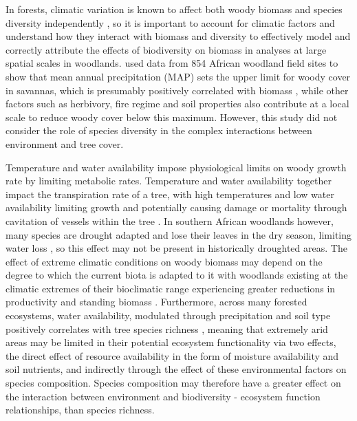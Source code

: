\documentclass[11pt,a4paper]{article}
\begin{document}

In forests, climatic variation is known to affect both woody biomass \citep{Michaletz2014, Michaletz2018} and species diversity independently \citep{}, so it is important to account for climatic factors and understand how they interact with biomass and diversity to effectively model and correctly attribute the effects of biodiversity on biomass in analyses at large spatial scales in woodlands. \citet{Sankaran2005} used data from 854 African woodland field sites to show that mean annual precipitation (MAP) sets the upper limit for woody cover in savannas, which is presumably positively correlated with biomass \citep{}, while other factors such as herbivory, fire regime and soil properties also contribute at a local scale to reduce woody cover below this maximum. However, this study did not consider the role of species diversity in the complex interactions between environment and tree cover. 

Temperature and water availability impose physiological limits on woody growth rate by limiting metabolic rates. Temperature and water availability together impact the transpiration rate of a tree, with high temperatures and low water availability limiting growth and potentially causing damage or mortality through cavitation of vessels within the tree \citep{Rowland2015a, Fensham2009}. In southern African woodlands however, many species are drought adapted and lose their leaves in the dry season, limiting water loss \citep{Solbrig1996}, so this effect may not be present in historically droughted areas. The effect of extreme climatic conditions on woody biomass may depend on the degree to which the current biota is adapted to it with woodlands existing at the climatic extremes of their bioclimatic range experiencing greater reductions in productivity and standing biomass \citep{}. Furthermore, across many forested ecosystems, water availability, modulated through precipitation and soil type positively correlates with tree species richness \citep{Vila2005}, meaning that extremely arid areas may be limited in their potential ecosystem functionality via two effects, the direct effect of resource availability in the form of moisture availability and soil nutrients, and indirectly through the effect of these environmental factors on species composition. Species composition may therefore have a greater effect on the interaction between environment and biodiversity - ecosystem function relationships, than species richness. 
\end{document}
